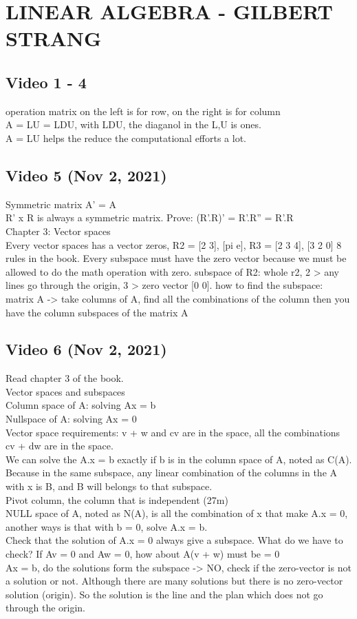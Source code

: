 
\section{LINEAR ALGEBRA - GILBERT STRANG}
\subsection{Video 1 - 4}

operation matrix on the left is for row, on the right is for column \cite{RN10}
\\A = LU = LDU, with LDU, the diaganol in the L,U is ones.
\\A = LU helps the reduce the computational efforts a lot.


\subsection{Video 5 (Nov 2, 2021)}

Symmetric matrix A' = A
\\R' x R is always a symmetric matrix. Prove: (R'.R)' = R'.R'' = R'.R
\\Chapter 3: Vector spaces
\\Every vector spaces has a vector zeros, R2 = [2 3], [pi e], R3 = [2 3 4], [3 2 0]
8 rules in the book.
Every subspace must have the zero vector because we must be allowed to do the math operation with zero.
subspace of R2: whole r2, 2 > any lines go through the origin, 3 > zero vector [0 0].
how to find the subspace: matrix A -> take columns of A, find all the combinations of the column then you have the column subspaces of the matrix A

\subsection{Video 6 (Nov 2, 2021) }

Read chapter 3 of the book.
\\Vector spaces and subspaces
\\Column space of A: solving Ax = b
\\Nullspace of A: solving Ax = 0
\\Vector space requirements: v + w and cv are in the space, all the combinations cv + dw are in the space.
\\We can solve the A.x = b exactly if b is in the column space of A, noted as C(A). Because in the same subspace, any linear combination of the columns in the A with x is B, and B will belongs to that subspace.
\\Pivot column, the column that is independent (27m)
\\NULL space of A, noted as N(A), is all the combination of x that make A.x = 0, another ways is that with b = 0, solve A.x = b.
\\Check that the solution of A.x = 0 always give a subspace. What do we have to check?
If Av = 0 and Aw = 0, how about A(v + w) must be = 0
\\Ax = b, do the solutions form the subspace -> NO, check if the zero-vector is not a solution or not. Although there are many solutions but there is no zero-vector solution (origin). So the solution is the line and the plan which does not go through the origin.

